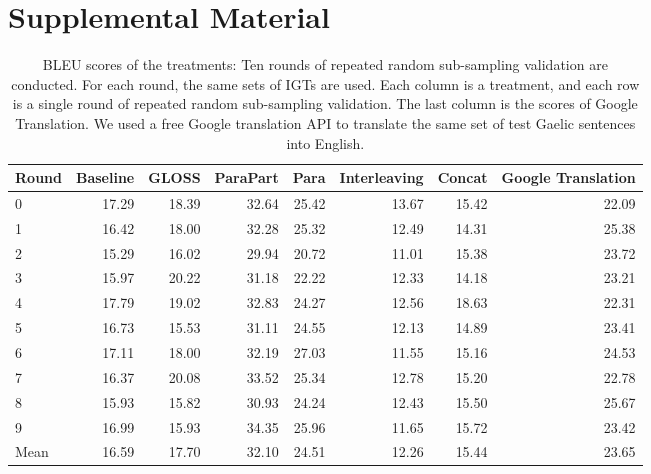 \documentclass[a4paper]{article}
\begin{document}
\section{Supplemental Material}
\begin{table}[ht]
\centering
\begin{tabular}{lrrrrrrr}
  \hline
Round & Baseline & GLOSS & ParaPart & Para & Interleaving & Concat & Google Translation \\ 
  \hline
0 & 17.29 & 18.39 & 32.64 & 25.42 & 13.67 & 15.42 & 22.09 \\ 
  1 & 16.42 & 18.00 & 32.28 & 25.32 & 12.49 & 14.31 & 25.38 \\ 
  2 & 15.29 & 16.02 & 29.94 & 20.72 & 11.01 & 15.38 & 23.72 \\ 
  3 & 15.97 & 20.22 & 31.18 & 22.22 & 12.33 & 14.18 & 23.21 \\ 
  4 & 17.79 & 19.02 & 32.83 & 24.27 & 12.56 & 18.63 & 22.31 \\ 
  5 & 16.73 & 15.53 & 31.11 & 24.55 & 12.13 & 14.89 & 23.41 \\ 
  6 & 17.11 & 18.00 & 32.19 & 27.03 & 11.55 & 15.16 & 24.53 \\ 
  7 & 16.37 & 20.08 & 33.52 & 25.34 & 12.78 & 15.20 & 22.78 \\ 
  8 & 15.93 & 15.82 & 30.93 & 24.24 & 12.43 & 15.50 & 25.67 \\ 
  9 & 16.99 & 15.93 & 34.35 & 25.96 & 11.65 & 15.72 & 23.42 \\ 
   \hline
Mean & 16.59 & 17.70 & 32.10 & 24.51 & 12.26 & 15.44 & 23.65 \\ 
   \hline
\end{tabular}
\caption{BLEU scores of the treatments: Ten rounds of repeated random sub-sampling validation are conducted. For each round, the same sets of IGTs are used. Each column is a treatment, and each row is a single round of repeated random sub-sampling validation. The last column is the scores of Google Translation. We used a free Google translation API \citep{google_api} to translate the same set of test Gaelic sentences into English.} 
\label{table:complete_table}
\end{table}
\end{document}
